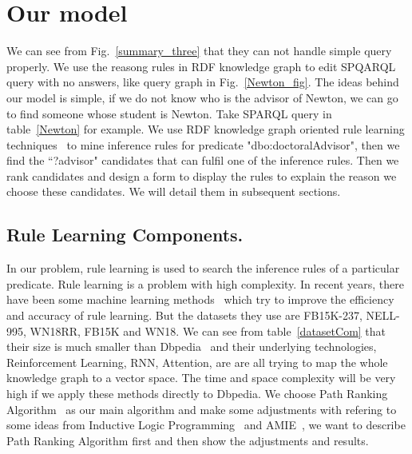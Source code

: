 \documentclass[runningheads]{llncs}
\begin{document}
\section{Our model}
We can see from Fig.~\ref{summary_three} that they can not handle simple query properly. We use the reasong rules in RDF knowledge graph to edit SPQARQL query with no answers, like query graph in Fig.~\ref{Newton_fig}. The ideas behind our model is simple, if we do not know who is the advisor of Newton, we can go to find someone whose student is Newton. Take SPARQL query in table~\ref{Newton} for example. We use RDF knowledge graph oriented rule learning techniques~\cite{lao2011random} to mine inference rules for predicate "dbo:doctoralAdvisor",  then we find the ``?advisor" candidates that can fulfil one of the inference rules. Then we rank candidates and design a form to display the rules to explain the reason we choose these candidates. We will detail them in subsequent sections.
\subsection{Rule Learning Components.}
In our problem, rule learning is used to search the inference rules of a particular predicate. Rule learning is a problem with high complexity. In recent years, there have been some machine learning methods~\cite{lao2011random,xiong2017deeppath,yang2017differentiable,das2017go} which try to improve the efficiency and accuracy of rule learning. But the datasets they use are FB15K-237, NELL-995, WN18RR, FB15K and WN18. We can see from table~\ref{datasetCom} that their size is much smaller than Dbpedia~\cite{dbpedi} and their underlying technologies, Reinforcement Learning, RNN, Attention, are are all trying to map the whole knowledge graph to a vector space. The time and space complexity will be very high if we apply these methods directly to Dbpedia.
We choose Path Ranking Algorithm~\cite{lao2011random} as our main algorithm and make some adjustments with refering to some ideas from Inductive Logic Programming~\cite{camacho2004inductive} and AMIE~\cite{galarraga2013amie}, we want to describe Path Ranking Algorithm first and then show the adjustments and results.
\end{document}
